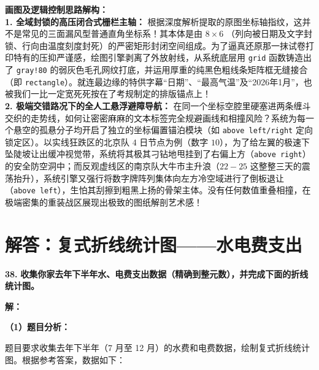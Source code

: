 \vspace{0.4cm}
{\small\color{blue!70!black}
\textbf{画图及逻辑控制思路解构：}\\
\textbf{1. 全域封锁的高压闭合式栅栏主轴：} 根据深度解析提取的原图坐标轴指纹，这并不是常见的三面漏风型普通直角坐标系！其本体是由 $8 \times 6$ （列向被日期及文字封锁、行向由温度刻度封死）的严密矩形封闭空间组成。为了逼真还原那一抹试卷打印特有的压抑严谨感，绘图引擎剥离了外放射线，从系统底层用 \texttt{grid} 函数铸造出了 \texttt{gray!80} 的弱灰色毛孔网纹打底，并运用厚重的纯黑色粗线条矩阵框无缝接合（即 \texttt{rectangle}）。就连最边缘的特供字幕“日期”、“最高气温”及“2026年1月”，也被我们一比一定宽死死按在了考规制定的排版锚点上！\\
\textbf{2. 极端交错路况下的全人工悬浮避障导航：} 在同一个坐标空腔里硬塞进两条缠斗交织的走势线，如何让密密麻麻的文本标签完全规避画线和相撞风险？系统为每一个悬空的孤悬分子均开启了独立的坐标偏置锚泊模块（如 \texttt{above left/right} 定向锁定区）。以实线狂跌区的北京队 $4$ 日节点为例（数字 $10$），为了给左翼的极速下坠陡坡让出缓冲视觉带，系统将其极其刁钻地甩挂到了右偏上方（\texttt{above right}）的安全防空洞中；而反观虚线区的南京队大牛市主升浪（$22-25$ 这整整三天的震荡抬升），系统引擎又强行将数字牌阵列集体向左方冷空域进行了倒板退让（\texttt{above left}），生怕其刮擦到粗黑上扬的骨架主体。没有任何数值重叠相撞，在极端密集的重装战区展现出极致的图纸解剖艺术感！
}

\newpage



\newpage

\section{解答：复式折线统计图——水电费支出}

\vspace{0.6cm}

\textbf{\LARGE 38.} \textbf{收集你家去年下半年水、电费支出数据（精确到整元数），并完成下面的折线统计图。}

\vspace{0.4cm}
\textbf{解：}

\textbf{（1）题目分析：}

题目要求收集去年下半年（7 月至 12 月）的水费和电费数据，绘制复式折线统计图。根据参考答案，数据如下：

